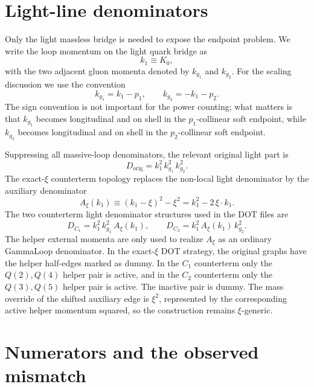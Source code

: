 \documentclass[11pt]{report}
\newcommand{\kgone}{k_{g_1}}
\newcommand{\kgtwo}{k_{g_2}}
\newcommand{\Axi}{A_\xi}
\begin{document}
\section{Light-line denominators}

Only the light massless bridge is needed to expose the endpoint problem. We
write the loop momentum on the light quark bridge as
\[
  k_1 \equiv K_0 ,
\]
with the two adjacent gluon momenta denoted by \(\kgone\) and \(\kgtwo\).
For the scaling discussion we use the convention
\[
  \kgone = k_1-p_1,\qquad
  \kgtwo = -k_1-p_2.
\]
The sign convention is not important for the power counting; what matters is
that \(\kgone\) becomes longitudinal and on shell in the \(p_1\)-collinear
soft endpoint, while \(\kgtwo\) becomes longitudinal and on shell in the
\(p_2\)-collinear soft endpoint.

Suppressing all massive-loop denominators, the relevant original light part is
\[
  D_{\mathrm{orig}} =
    k_1^2\,\kgone^2\,\kgtwo^2 .
  \label{eq:orig-light-den}
\]
The exact-\(\xi\) counterterm topology replaces the non-local light
denominator by the auxiliary denominator
\[
  \Axi(k_1) \equiv (k_1-\xi)^2-\xi^2 = k_1^2-2\,\xi\cdot k_1.
  \label{eq:axi}
\]
The two counterterm light denominator structures used in the DOT files are
\[
  D_{C_1} = k_1^2\,\kgone^2\,\Axi(k_1),\qquad
  D_{C_2} = k_1^2\,\Axi(k_1)\,\kgtwo^2 .
  \label{eq:ct-denominators}
\]
The helper external momenta are only used to realize \(\Axi\) as an ordinary
GammaLoop denominator. In the exact-\(\xi\) DOT strategy, the original graphs
have the helper half-edges marked as dummy. In the \(C_1\) counterterm only
the \(Q(2),Q(4)\) helper pair is active, and in the \(C_2\) counterterm only
the \(Q(3),Q(5)\) helper pair is active. The inactive pair is dummy. The mass
override of the shifted auxiliary edge is \(\xi^2\), represented by the
corresponding active helper momentum squared, so the construction remains
\(\xi\)-generic.

\section{Numerators and the observed mismatch}
\end{document}
